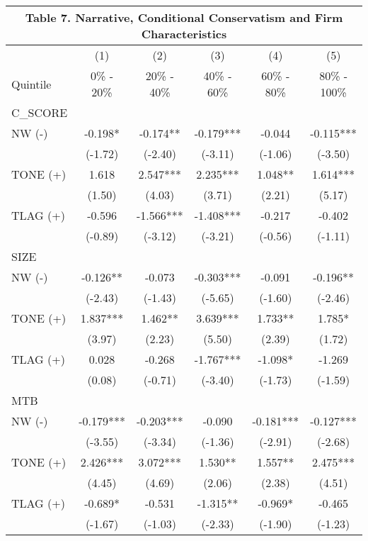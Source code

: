 \begin{table}[H]	\label{T7}%
	\begin{center}
		\begin{tabular}{lccccc}
			\multicolumn{6}{c}{\textbf{Table 7. Narrative, Conditional Conservatism and Firm Characteristics}} \\
			\midrule
			\midrule
			& (1) & (2) & (3) & (4) & (5) \\
			Quintile & 0\% - 20\% & 20\% - 40\% & 40\% - 60\% & 60\% - 80\% & 80\% - 100\% \\
			\midrule
			C\_SCORE &  &  &  &  &  \\
			\midrule
			NW (-) & -0.198* & -0.174** & -0.179*** & -0.044 & -0.115*** \\
			& (-1.72) & (-2.40) & (-3.11) & (-1.06) & (-3.50) \\
			TONE (+) & 1.618 & 2.547*** & 2.235*** & 1.048** & 1.614*** \\
			& (1.50) & (4.03) & (3.71) & (2.21) & (5.17) \\
			TLAG (+) & -0.596 & -1.566*** & -1.408*** & -0.217 & -0.402 \\
			& (-0.89) & (-3.12) & (-3.21) & (-0.56) & (-1.11) \\
			\midrule
			SIZE &   &   &   &   &  \\
			\midrule
			NW (-) & -0.126** & -0.073 & -0.303*** & -0.091 & -0.196** \\
			& (-2.43) & (-1.43) & (-5.65) & (-1.60) & (-2.46) \\
			TONE (+) & 1.837*** & 1.462** & 3.639*** & 1.733** & 1.785* \\
			& (3.97) & (2.23) & (5.50) & (2.39) & (1.72) \\
			TLAG (+) & 0.028 & -0.268 & -1.767*** & -1.098* & -1.269 \\
			& (0.08) & (-0.71) & (-3.40) & (-1.73) & (-1.59) \\
			\midrule
			MTB &   &   &   &   &  \\
			\midrule
			NW (-) & -0.179*** & -0.203*** & -0.090 & -0.181*** & -0.127*** \\
			& (-3.55) & (-3.34) & (-1.36) & (-2.91) & (-2.68) \\
			TONE (+) & 2.426*** & 3.072*** & 1.530** & 1.557** & 2.475*** \\
			& (4.45) & (4.69) & (2.06) & (2.38) & (4.51) \\
			TLAG (+) & -0.689* & -0.531 & -1.315** & -0.969* & -0.465 \\
			& (-1.67) & (-1.03) & (-2.33) & (-1.90) & (-1.23) \\

\end{tabular}
\end{center}
\end{table}
